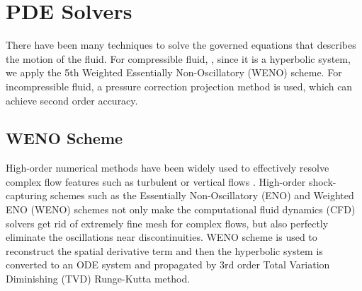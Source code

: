 \section{PDE Solvers}
\label{Sec:PDES}

There have been many techniques to solve the governed equations that describes 
the motion of the fluid. 
For compressible fluid, , since it is a hyperbolic system, 
we apply the 5th Weighted Essentially Non-Oscillatory (WENO) scheme. 
For incompressible fluid, a pressure correction projection method is used, 
which can achieve second order accuracy. 

\subsection{WENO Scheme}
High-order numerical methods have been widely used to effectively resolve 
complex flow features such as turbulent or vertical flows 
\cite{Ekaterinaris2005192}. 
High-order shock-capturing schemes such as the Essentially Non-Oscillatory 
(ENO) and Weighted ENO (WENO) \cite{Liu1994200,Jiang1996202} schemes not 
only make the computational fluid dynamics (CFD) solvers get rid of 
extremely fine mesh for complex flows, but also perfectly eliminate the 
oscillations near discontinuities. 
WENO scheme is used to reconstruct the spatial derivative term and then the 
hyperbolic system is converted to an ODE system and propagated by 3rd order 
Total Variation Diminishing (TVD) Runge-Kutta method. 

